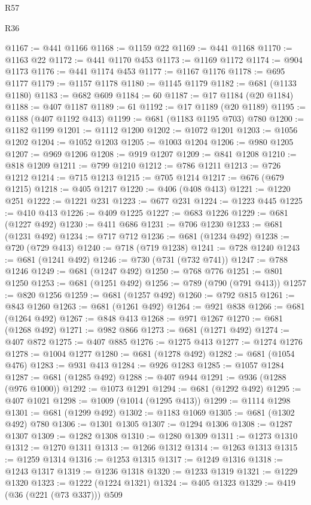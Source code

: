\begin{lexlean}{R57}
\begin{lexlean}{R36}
\begin{coremodule}
{{{{{{{{{{{{{{{{{{{{{{{{{{{{{{{{{{{{{{{{{{{{{{{{{{{{{{{{{{{{{{{{{{{{{{{{{{{{{{{{{{@1167 := @441 @1166
@1168 := @1159 @22
@1169 := @441 @1168
@1170 := @1163 @22
@1172 := @441 @1170 @453
@1173 := @1169 @1172
@1174 := @904 @1173
@1176 := @441 @1174 @453
@1177 := @1167 @1176
@1178 := @695 @1177
@1179 := @1157 @1178
@1180 := @1145 @1179
@1182 := @681 (@1133 @1180)
@1183 := @682 @609
@1184 := 60
@1187 := @17 @1184 (@20 @1184)
@1188 := @407 @1187
@1189 := 61
@1192 := @17 @1189 (@20 @1189)
@1195 := @1188 (@407 @1192 @413)
@1199 := @681 (@1183 @1195 @703) @780
@1200 := @1182 @1199
@1201 := @1112 @1200
@1202 := @1072 @1201
@1203 := @1056 @1202
@1204 := @1052 @1203
@1205 := @1003 @1204
@1206 := @980 @1205
@1207 := @969 @1206
@1208 := @919 @1207
@1209 := @841 @1208
@1210 := @818 @1209
@1211 := @799 @1210
@1212 := @786 @1211
@1213 := @726 @1212
@1214 := @715 @1213
@1215 := @705 @1214
@1217 := @676 (@679 @1215)
@1218 := @405 @1217
@1220 := @406 (@408 @413)
@1221 := @1220 @251
@1222 := @1221 @231
@1223 := @677 @231
@1224 := @1223 @445
@1225 := @410 @413
@1226 := @409 @1225
@1227 := @683 @1226
@1229 := @681 (@1227 @492)
@1230 := @411 @686
@1231 := @706 @1230
@1233 := @681 (@1231 @492)
@1234 := @717 @712
@1236 := @681 (@1234 @492)
@1238 := @720 (@729 @413)
@1240 := @718 (@719 @1238)
@1241 := @728 @1240
@1243 := @681 (@1241 @492)
@1246 := @730 (@731 (@732 @741))
@1247 := @788 @1246
@1249 := @681 (@1247 @492)
@1250 := @768 @776
@1251 := @801 @1250
@1253 := @681 (@1251 @492)
@1256 := @789 (@790 (@791 @413))
@1257 := @820 @1256
@1259 := @681 (@1257 @492)
@1260 := @792 @815
@1261 := @843 @1260
@1263 := @681 (@1261 @492)
@1264 := @921 @838
@1266 := @681 (@1264 @492)
@1267 := @848 @413
@1268 := @971 @1267
@1270 := @681 (@1268 @492)
@1271 := @982 @866
@1273 := @681 (@1271 @492)
@1274 := @407 @872
@1275 := @407 @885
@1276 := @1275 @413
@1277 := @1274 @1276
@1278 := @1004 @1277
@1280 := @681 (@1278 @492)
@1282 := @681 (@1054 @476)
@1283 := @931 @413
@1284 := @926 @1283
@1285 := @1057 @1284
@1287 := @681 (@1285 @492)
@1288 := @407 @944
@1291 := @936 (@1288 (@976 @1000))
@1292 := @1073 @1291
@1294 := @681 (@1292 @492)
@1295 := @407 @1021
@1298 := @1009 (@1014 (@1295 @413))
@1299 := @1114 @1298
@1301 := @681 (@1299 @492)
@1302 := @1183 @1069
@1305 := @681 (@1302 @492) @780
@1306 := @1301 @1305
@1307 := @1294 @1306
@1308 := @1287 @1307
@1309 := @1282 @1308
@1310 := @1280 @1309
@1311 := @1273 @1310
@1312 := @1270 @1311
@1313 := @1266 @1312
@1314 := @1263 @1313
@1315 := @1259 @1314
@1316 := @1253 @1315
@1317 := @1249 @1316
@1318 := @1243 @1317
@1319 := @1236 @1318
@1320 := @1233 @1319
@1321 := @1229 @1320
@1323 := @1222 (@1224 @1321)
@1324 := @405 @1323
@1329 := @419 (@36 (@221 (@73 @337))) @509
}}}}}}}}}}}}}}}}}}}}}}}}}}}}}}}}}}}}}}}}}}}}}}}}}}}}}}}}}}}}}}}}}}}}}}}}}}}}}}}}}}
\end{coremodule}
\end{lexlean}
\end{lexlean}
